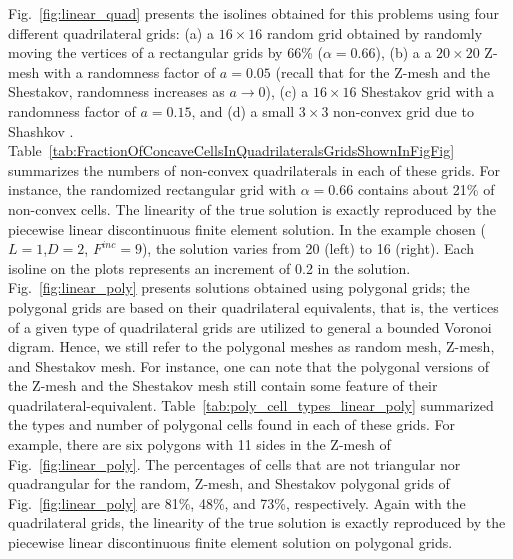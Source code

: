 \documentclass[preprint,10pt]{elsarticle}
\newcommand{\fig}[1]{Fig.~\ref{#1}}                      %
\newcommand{\tbl}[1]{Table~\ref{#1}}                     %
\begin{document}
\fig{fig:linear_quad} presents the isolines obtained for this problems using four different quadrilateral grids:
(a) a $16 \times 16$ random grid obtained by randomly moving the vertices of a rectangular grids by 66\% ($\alpha=0.66$), 
(b) a a $20 \times 20$ Z-mesh with a randomness factor of $a=0.05$ (recall that for the Z-mesh and the Shestakov, randomness increases
as $a\to 0$), 
(c) a $16 \times 16$ Shestakov grid  with a randomness factor of $a=0.15$, and 
(d) a small  $3 \times 3$ non-convex grid due to Shashkov \cite{ShashkovSteinberg1996}.
\tbl{tab:FractionOfConcaveCellsInQuadrilateralsGridsShownInFigFig} summarizes the numbers of non-convex quadrilaterals in each of these grids.  For instance, the randomized rectangular grid with $\alpha=0.66$ contains about 21\% of non-convex cells. 
The linearity of the true solution is exactly reproduced by the piecewise linear discontinuous finite element solution. In the example chosen ($L=1$,$D=2$, $F^{inc}=9$), the solution varies from 20 (left) to 16 (right). Each isoline on the plots represents an increment of 0.2 in the solution.
%
\fig{fig:linear_poly} presents solutions obtained using polygonal grids; the polygonal grids are based on their quadrilateral equivalents, that is, the vertices of a given type of quadrilateral grids are utilized to general a bounded Voronoi digram. Hence, we still refer to the polygonal meshes as random mesh, Z-mesh, and Shestakov mesh. For instance, one can note that the polygonal versions of the Z-mesh and the Shestakov mesh still contain some feature of their quadrilateral-equivalent. \tbl{tab:poly_cell_types_linear_poly} summarized the types and number of polygonal cells found in each of these grids. 
For example, there are six polygons with 11 sides in the Z-mesh of \fig{fig:linear_poly}. The percentages of cells that are not triangular nor quadrangular for the random, Z-mesh, and Shestakov polygonal grids of \fig{fig:linear_poly} are 81\%, 48\%, and 73\%, respectively. Again with the quadrilateral grids,  the linearity of the true solution is exactly reproduced by the piecewise linear discontinuous finite element solution on polygonal grids.
\end{document}

